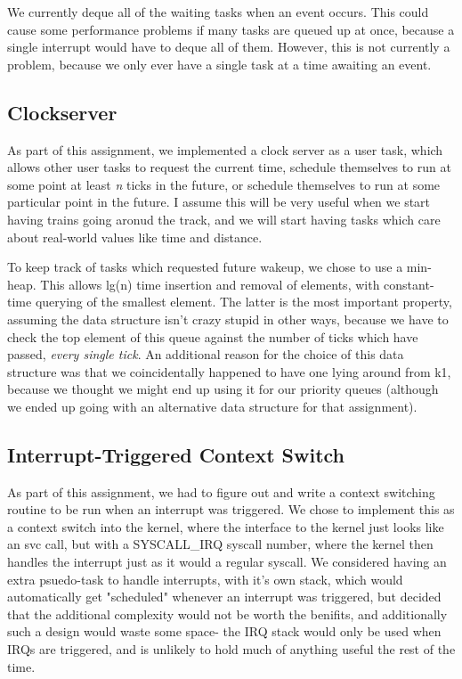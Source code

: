 \documentclass[titlepage]{article}
\begin{document}
We currently deque all of the waiting tasks when an event occurs. This could
cause some performance problems if many tasks are queued up at once, because
a single interrupt would have to deque all of them. However, this is not
currently a problem, because we only ever have a single task at a time
awaiting an event.

\subsection{Clockserver}
As part of this assignment, we implemented a clock server as a user task, which
allows other user tasks to request the current time, schedule themselves to run
at some point at least \emph{n} ticks in the future, or schedule themselves to
run at some particular point in the future. I assume this will be very useful
when we start having trains going aronud the track, and we will start having
tasks which care about real-world values like time and distance.

To keep track of tasks which requested future wakeup, we chose to use a
min-heap. This allows lg(n) time insertion and removal of elements, with
constant-time querying of the smallest element. The latter is the most
important property, assuming the data structure isn't crazy stupid in other
ways, because we have to check the top element of this queue against the
number of ticks which have passed, \emph{every single tick}. An additional
reason for the choice of this data structure was that we coincidentally
happened to have one lying around from k1, because we thought we might end up
using it for our priority queues (although we ended up going with an
alternative data structure for that assignment).

\subsection{Interrupt-Triggered Context Switch}
As part of this assignment, we had to figure out and write a context switching
routine to be run when an interrupt was triggered. We chose to implement this as
a context switch into the kernel, where the interface to the kernel just looks
like an svc call, but with a SYSCALL_IRQ syscall number, where the kernel then
handles the interrupt just as it would a regular syscall. We considered having
an extra psuedo-task to handle interrupts, with it's own stack, which would
automatically get "scheduled" whenever an interrupt was triggered, but decided
that the additional complexity would not be worth the benifits, and additionally
such a design would waste some space- the IRQ stack would only be used when
IRQs are triggered, and is unlikely to hold much of anything useful the rest
of the time.
\end{document}
